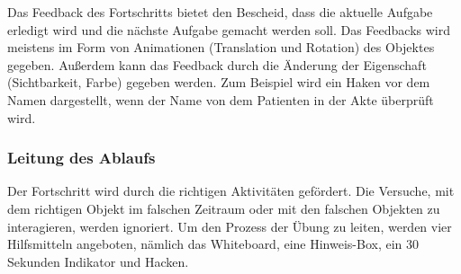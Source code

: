   Das Feedback des Fortschritts bietet den Bescheid, dass die aktuelle Aufgabe erledigt wird und die nächste Aufgabe gemacht werden soll. Das Feedbacks wird meistens im Form von Animationen (Translation und Rotation) des Objektes gegeben. Außerdem kann das Feedback durch die Änderung der Eigenschaft (Sichtbarkeit, Farbe) gegeben werden. Zum Beispiel wird ein Haken vor dem Namen dargestellt, wenn der Name von dem Patienten in der Akte überprüft wird.
  
  \subsubsection{Leitung des Ablaufs}
  Der Fortschritt wird durch die richtigen Aktivitäten gefördert. Die Versuche, mit dem richtigen Objekt im falschen Zeitraum oder mit den falschen Objekten zu interagieren, werden ignoriert. Um den Prozess der Übung zu leiten, werden vier Hilfsmitteln angeboten, nämlich das Whiteboard, eine Hinweis-Box, ein 30 Sekunden Indikator und Hacken.
